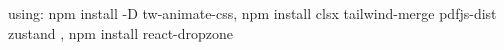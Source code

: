 using: npm install -D tw-animate-css, npm install clsx tailwind-merge pdfjs-dist zustand , npm install react-dropzone
